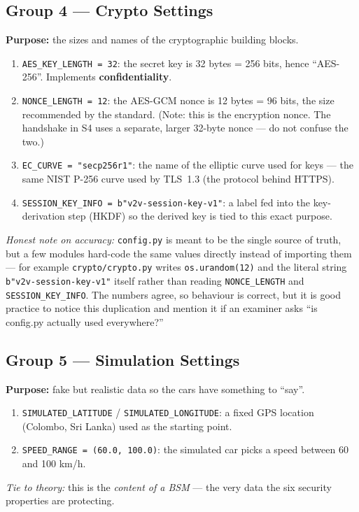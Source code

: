\documentclass[11pt,a4paper]{report}
\begin{document}
\subsection{Group 4 --- Crypto Settings}
\textbf{Purpose:} the sizes and names of the cryptographic building blocks.
\begin{enumerate}
  \item \texttt{AES\_KEY\_LENGTH = 32}: the secret key is 32 bytes = 256 bits,
        hence ``AES-256''. Implements \textbf{confidentiality}.
  \item \texttt{NONCE\_LENGTH = 12}: the AES-GCM nonce is 12 bytes = 96 bits,
        the size recommended by the standard. (Note: this is the encryption
        nonce. The handshake in S4 uses a separate, larger 32-byte nonce ---
        do not confuse the two.)
  \item \texttt{EC\_CURVE = "secp256r1"}: the name of the elliptic curve used
        for keys --- the same NIST P-256 curve used by TLS~1.3 (the protocol
        behind HTTPS).
  \item \texttt{SESSION\_KEY\_INFO = b"v2v-session-key-v1"}: a label fed into the
        key-derivation step (HKDF) so the derived key is tied to this exact
        purpose.
\end{enumerate}
\emph{Honest note on accuracy:} \texttt{config.py} is meant to be the single
source of truth, but a few modules hard-code the same values directly instead of
importing them --- for example \texttt{crypto/crypto.py} writes
\texttt{os.urandom(12)} and the literal string \texttt{b"v2v-session-key-v1"}
itself rather than reading \texttt{NONCE\_LENGTH} and \texttt{SESSION\_KEY\_INFO}.
The numbers agree, so behaviour is correct, but it is good practice to notice
this duplication and mention it if an examiner asks ``is config.py actually
used everywhere?''

\subsection{Group 5 --- Simulation Settings}
\textbf{Purpose:} fake but realistic data so the cars have something to ``say''.
\begin{enumerate}
  \item \texttt{SIMULATED\_LATITUDE} / \texttt{SIMULATED\_LONGITUDE}: a fixed GPS
        location (Colombo, Sri Lanka) used as the starting point.
  \item \texttt{SPEED\_RANGE = (60.0, 100.0)}: the simulated car picks a speed
        between 60 and 100 km/h.
\end{enumerate}
\emph{Tie to theory:} this is the \emph{content of a BSM} --- the very data the
six security properties are protecting.
\end{document}
